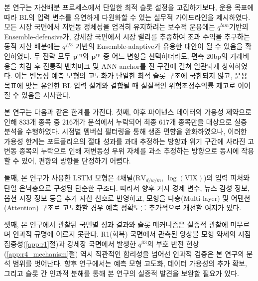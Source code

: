 \documentclass{article}
\begin{document}
본 연구는 자산배분 프로세스에서 단일한 최적 슬롯 설정을 고집하기보다, 운용 목표에 따라 BL의 입력 변수를 유연하게 다원화할 수 있는 실무적 가이드라인을 제시하였다. 모든 시장 국면에서 저변동 정체성을 엄격히 유지하려는 보수적 운용에는 $q^{lam}$‬기반의 Ensemble-defensive가, 강세장 국면에서 시장 랠리를 추종하여 초과 수익을 추구하는 동적 자산 배분에는 $q^{ff3}$‬ 기반의 Ensemble-adaptive가 유용한 대안이 될 수 있음을 확인하였다. 두 전략 모두 $\mathbf{p}^{\mathrm{eq}}$와 $\mathbf{p}^{\mathrm{rp}}$‬ 중 어느 변형을 선택하더라도, 편측 20bp의 거래비용을 차감 후 전통적 벤치마크 및 ANN-anchor를 전 구간에 걸쳐 일관되게 상회하였다. 이는 변동성 예측 모형의 고도화가 단일한 최적 슬롯 구조에 국한되지 않고, 운용 목표에 맞는 유연한 BL 입력 설계와 결합될 때 실질적인 위험조정수익률 제고로 이어질 수 있음을 시사한다.

본 연구는 다음과 같은 한계를 가진다. 첫째, 야후 파이낸스 데이터의 가용성 제약으로 인해 833개 종목 중 216개가 분석에서 누락되어 최종 617개 종목만을 대상으로 실증 분석을 수행하였다. 시점별 멤버십 필터링을 통해 생존 편향을 완화하였으나, 이러한 가용성 한계는 포트폴리오의 절대 성과를 과대 추정하는 방향과 위기 구간에 사라진 고변동 종목의 누락으로 인해 저변동성 우위 자체를 과소 추정하는 방향으로 동시에 작용할 수 있어, 편향의 방향을 단정하기 어렵다.

둘째, 본 연구가 사용한 LSTM 모형은 4채널($\mathrm{RV}_{d/w/m}$, $\log(\mathrm{VIX})$)의 입력 피처와 단일 은닉층으로 구성된 단순한 구조다. 따라서 향후 거시 경제 변수, 뉴스 감성 정보, 옵션 시장 정보 등을 추가 자산 신호로 반영하고, 모형을 다층(Multi-layer) 및 어텐션(Attention) 구조로 고도화할 경우 예측 정확도를 추가적으로 개선할 여지가 있다.

셋째, 본 연구에서 관찰된 국면별 성과 결과와 슬롯 메커니즘은 실증적 관찰에 머무르며 인과적 규명에 이르지 못한다. R1(회복) 국면에서 관측된 앙상블 모형 약세의 시점 집중성(\ref{app:r1}절)과 강세장 국면에서 발생한 $q^{\mathrm{ff3}}$의 부호 반전 현상(\ref{app:r4_mechanism}절) 역시 직관적인 합리성을 넘어선 인과적 검증은 본 연구의 분석 범위를 벗어난다. 향후 연구에서는 예측 모형 고도화, 데이터 가용성의 추가 확보, 그리고 슬롯 간 인과적 분해를 통해 본 연구의 실증적 발견을 보완할 필요가 있다.
\end{document}
